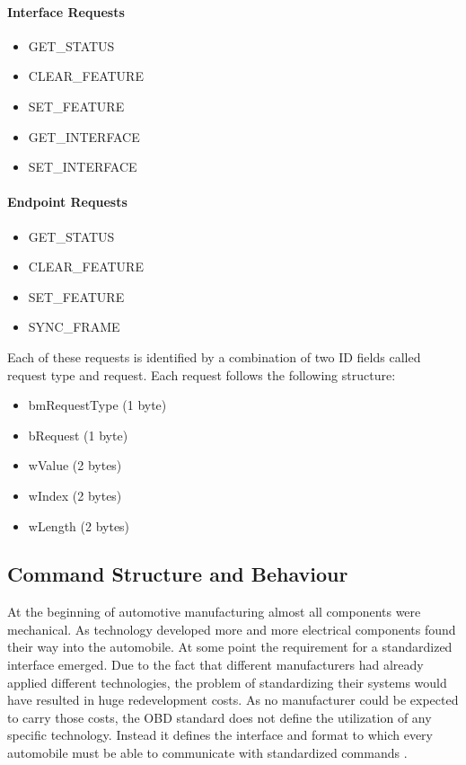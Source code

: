 \paragraph{Interface Requests}
\begin{itemize}
 \item GET\_STATUS
 \item CLEAR\_FEATURE
 \item SET\_FEATURE
 \item GET\_INTERFACE
 \item SET\_INTERFACE
\end{itemize}

\paragraph{Endpoint Requests}
\begin{itemize}
 \item GET\_STATUS
 \item CLEAR\_FEATURE
 \item SET\_FEATURE
 \item SYNC\_FRAME
\end{itemize}

Each of these requests is identified by a combination of two ID fields called request type and request. Each request follows the 
following structure:

\begin{itemize}
 \item bmRequestType (1 byte)
 \item bRequest (1 byte)
 \item wValue (2 bytes)
 \item wIndex (2 bytes)
 \item wLength (2 bytes)
\end{itemize}

\subsection{Command Structure and Behaviour}

At the beginning of automotive manufacturing almost all components were mechanical. As technology developed more and more electrical 
components found their way into the automobile. At some point the requirement for a standardized interface emerged. Due to the fact 
that different manufacturers had already applied different technologies, the problem of standardizing their systems would have 
resulted in huge redevelopment costs. As no manufacturer could be expected to carry those costs, the OBD standard does not define the 
utilization of any specific technology. Instead it defines the interface and format to which every automobile must be able to 
communicate with standardized commands \cite{SCHAFOBD1}.

